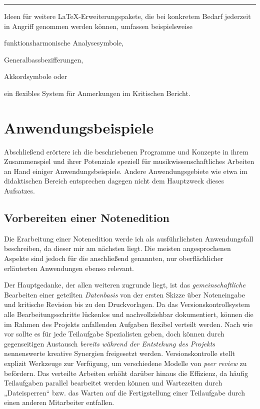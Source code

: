 \documentclass[DIV=12]{scrreprt}
\begin{document}
\bigskip
\hrule
\bigskip
Ideen für weitere \LaTeX-Erweiterungspakete, die bei konkretem Bedarf jederzeit in Angriff genommen werden können, umfassen beispielsweise 

\begin{itemize*}
\item funktionsharmonische Analysesymbole,
\item Generalbassbezifferungen,
\item Akkordsymbole oder
\item ein flexibles System für Anmerkungen im Kritischen Bericht.
\end{itemize*}

\chapter{Anwendungsbeispiele}
\label{chap:pt_applications}

Abschließend erörtere ich die beschriebenen Programme und Konzepte in ihrem Zusammenspiel und ihrer Potenziale speziell für musikwissenschaftliches Arbeiten an Hand einiger Anwendungsbeispiele.
Andere Anwendungsgebiete wie etwa im didaktischen Bereich entsprechen dagegen nicht dem Hauptzweck dieses Aufsatzes.

\section{Vorbereiten einer Notenedition}
\label{sec:pt_preparing-edition}
Die Erarbeitung einer Notenedition werde ich als ausführlichsten Anwendungsfall beschreiben, da dieser mir am nächsten liegt.
Die meisten angesprochenen Aspekte sind jedoch für die anschließend genannten, nur oberflächlicher erläuterten Anwendungen ebenso relevant.

\medskip
 
Der Hauptgedanke, der allen weiteren zugrunde liegt, ist das \emph{gemeinschaftliche} Bearbeiten einer geteilten \emph{Datenbasis} von der ersten Skizze über Noteneingabe und kritische Revision bis zu den Druckvorlagen.
Da das Versionskontrollsystem alle Bearbeitungsschritte lückenlos und nachvollziehbar dokumentiert, können die im Rahmen des Projekts anfallenden Aufgaben flexibel verteilt werden.
Nach wie vor sollte es für jede Teilaufgabe Spezialisten geben, doch können durch gegenseitigen Austausch \emph{bereits während der Entstehung des Projekts} nennenswerte kreative Synergien freigesetzt werden.
Versionskontrolle stellt explizit Werkzeuge zur Verfügung, um verschiedene Modelle von \emph{peer review} zu befördern.
Das verteilte Arbeiten erhöht darüber hinaus die Effizienz, da häufig Teilaufgaben parallel bearbeitet werden können und Wartezeiten durch „Dateisperren“ bzw. das Warten auf die Fertigstellung einer Teilaufgabe durch einen anderen Mitarbeiter entfallen.
\end{document}
